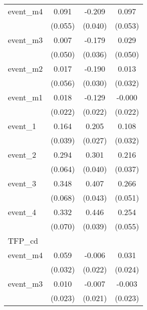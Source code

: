 {\begin{tabular}{l*{3}{c}}
event\_m4    &       0.091         &      -0.209\sym{***}&       0.097         \\
            &     (0.055)         &     (0.040)         &     (0.053)         \\
[1em]
event\_m3    &       0.007         &      -0.179\sym{***}&       0.029         \\
            &     (0.050)         &     (0.036)         &     (0.050)         \\
[1em]
event\_m2    &       0.017         &      -0.190\sym{***}&       0.013         \\
            &     (0.056)         &     (0.030)         &     (0.032)         \\
[1em]
event\_m1    &       0.018         &      -0.129\sym{***}&      -0.000         \\
            &     (0.022)         &     (0.022)         &     (0.022)         \\
[1em]
event\_1     &       0.164\sym{***}&       0.205\sym{***}&       0.108\sym{***}\\
            &     (0.039)         &     (0.027)         &     (0.032)         \\
[1em]
event\_2     &       0.294\sym{***}&       0.301\sym{***}&       0.216\sym{***}\\
            &     (0.064)         &     (0.040)         &     (0.037)         \\
[1em]
event\_3     &       0.348\sym{***}&       0.407\sym{***}&       0.266\sym{***}\\
            &     (0.068)         &     (0.043)         &     (0.051)         \\
[1em]
event\_4     &       0.332\sym{***}&       0.446\sym{***}&       0.254\sym{***}\\
            &     (0.070)         &     (0.039)         &     (0.055)         \\
\hline
TFP\_cd      &                     &                     &                     \\
event\_m4    &       0.059         &      -0.006         &       0.031         \\
            &     (0.032)         &     (0.022)         &     (0.024)         \\
[1em]
event\_m3    &       0.010         &      -0.007         &      -0.003         \\
            &     (0.023)         &     (0.021)         &     (0.023)         \\

\end{tabular}}
